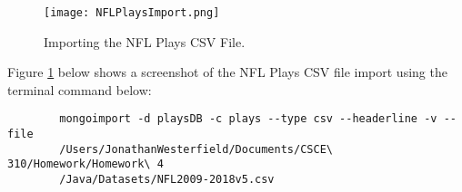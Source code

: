 \documentclass [a4paper,12pt] {article}
\begin{document}
    \begin{figure}
        \texttt{[image: NFLPlaysImport.png]}
        \caption{Importing the NFL Plays CSV File.}
        \label{fig:import1}
    \end{figure} 

    Figure \ref{fig:import1} below shows a screenshot of the NFL Plays CSV file import
    using the terminal command below:

    \begin{verbatim}
        mongoimport -d playsDB -c plays --type csv --headerline -v --file 
        /Users/JonathanWesterfield/Documents/CSCE\ 310/Homework/Homework\ 4
        /Java/Datasets/NFL2009-2018v5.csv
    \end{verbatim}
\end{document}
